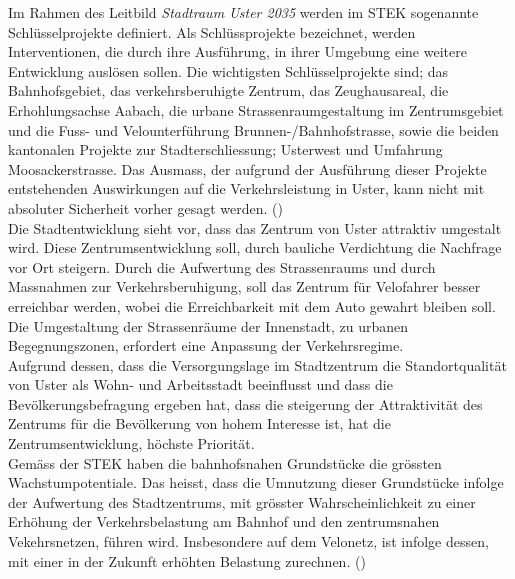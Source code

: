 Im Rahmen des Leitbild \textit{Stadtraum Uster 2035} werden im STEK sogenannte Schlüsselprojekte definiert. Als Schlüssprojekte bezeichnet, werden Interventionen, die durch ihre Ausführung, in ihrer Umgebung eine weitere Entwicklung auslösen sollen. Die wichtigsten Schlüsselprojekte sind; das Bahnhofsgebiet, das verkehrsberuhigte Zentrum, das Zeughausareal, die Erhohlungsachse Aabach, die urbane Strassenraumgestaltung im Zentrumsgebiet und die Fuss- und Velounterführung Brunnen-/Bahnhofstrasse, sowie die beiden kantonalen Projekte zur Stadterschliessung; Usterwest und Umfahrung Moosackerstrasse. Das Ausmass, der aufgrund der Ausführung dieser Projekte entstehenden Auswirkungen auf die Verkehrsleistung in Uster, kann nicht mit absoluter Sicherheit vorher gesagt werden. (\cite{STEK}) \\

Die Stadtentwicklung sieht vor, dass das Zentrum von Uster attraktiv umgestalt wird. Diese Zentrumsentwicklung soll, durch bauliche Verdichtung die Nachfrage vor Ort steigern. Durch die Aufwertung des Strassenraums und durch Massnahmen zur Verkehrsberuhigung, soll das Zentrum für Velofahrer besser erreichbar werden, wobei die Erreichbarkeit mit dem Auto gewahrt bleiben soll. Die Umgestaltung der Strassenräume der Innenstadt, zu urbanen Begegnungszonen, erfordert eine Anpassung der Verkehrsregime. \\
Aufgrund dessen, dass die Versorgungslage im Stadtzentrum die Standortqualität von Uster als Wohn- und Arbeitsstadt beeinflusst und dass die Bevölkerungsbefragung ergeben hat, dass die steigerung der Attraktivität des Zentrums für die Bevölkerung von hohem Interesse ist, hat die Zentrumsentwicklung, höchste Priorität. \\
Gemäss der STEK haben die bahnhofsnahen Grundstücke die grössten Wachstumpotentiale. Das heisst, dass die Umnutzung dieser Grundstücke infolge der Aufwertung des Stadtzentrums, mit grösster Wahrscheinlichkeit zu einer Erhöhung der Verkehrsbelastung am Bahnhof und den zentrumsnahen Vekehrsnetzen, führen wird. Insbesondere auf dem Velonetz, ist infolge dessen, mit einer in der Zukunft erhöhten Belastung zurechnen. 
(\cite{STEK})

